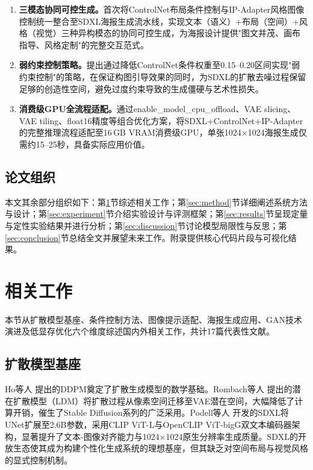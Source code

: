 \documentclass[12pt,a4paper]{ctexart}
\begin{document}
\begin{enumerate}[itemsep=0pt,topsep=4pt]
    \item \textbf{三模态协同可控生成。}首次将ControlNet布局条件控制与IP-Adapter风格图像控制统一整合至SDXL海报生成流水线，实现文本（语义）+布局（空间）+风格（视觉）三种异构模态的协同可控生成，为海报设计提供"图文并茂、画布指导、风格定制"的完整交互范式。
    \item \textbf{弱约束控制策略。}提出通过降低ControlNet条件权重至0.15--0.20区间实现"弱约束控制"的策略，在保证构图引导效果的同时，为SDXL的扩散去噪过程保留足够的创造性空间，避免过度约束导致的生成僵硬与艺术性损失。
    \item \textbf{消费级GPU全流程适配。}通过enable\_model\_cpu\_offload、VAE slicing、VAE tiling、float16精度等组合优化方案，将SDXL+ControlNet+IP-Adapter的完整推理流程适配至16\,GB VRAM消费级GPU，单张1024$\times$1024海报生成仅需约15--25秒，具备实际应用价值。
\end{enumerate}

\subsection{论文组织}

本文其余部分组织如下：第\ref{sec:related}节综述相关工作；第\ref{sec:method}节详细阐述系统方法与设计；第\ref{sec:experiment}节介绍实验设计与评测框架；第\ref{sec:results}节呈现定量与定性实验结果并进行分析；第\ref{sec:discussion}节讨论模型局限性与反思；第\ref{sec:conclusion}节总结全文并展望未来工作。附录提供核心代码片段与可视化结果。

\section{相关工作}
\label{sec:related}

本节从扩散模型基座、条件控制方法、图像提示适配、海报生成应用、GAN技术演进及低显存优化六个维度综述国内外相关工作，共计17篇代表性文献。

\subsection{扩散模型基座}

Ho等人\cite{ho2020ddpm} 提出的DDPM奠定了扩散生成模型的数学基础。Rombach等人\cite{rombach2022high} 提出的潜在扩散模型（LDM）将扩散过程从像素空间迁移至VAE潜在空间，大幅降低了计算开销，催生了Stable Diffusion系列的广泛采用。Podell等人\cite{podell2023sdxl} 开发的SDXL将UNet扩展至2.6B参数，采用CLIP ViT-L与OpenCLIP ViT-bigG双文本编码器架构，显著提升了文本-图像对齐能力与1024$\times$1024原生分辨率生成质量。SDXL的开放生态使其成为构建个性化生成系统的理想基座，但其缺乏对空间布局与视觉风格的显式控制机制。
\end{document}
